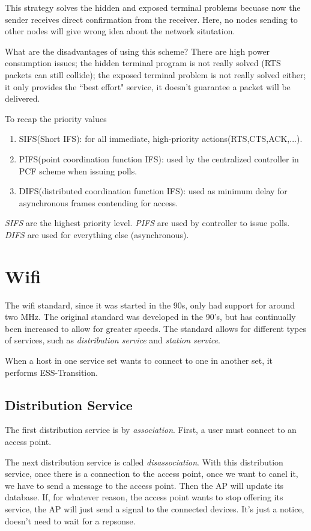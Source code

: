 \documentclass{article}
\begin{document}
This strategy solves the hidden and exposed terminal problems becuase now the sender receives direct confirmation from the 
receiver. Here, no nodes sending to other nodes will give wrong idea about the network situtation.

What are the disadvantages of using this scheme? There are high power consumption issues; the hidden terminal program is
not really solved (RTS packets can still collide); the exposed terminal problem is not really solved either; it only 
provides the ``best effort" service, it doesn't guarantee a packet will be delivered.

 To recap the priority values
\begin{enumerate}
		\item{SIFS(Short IFS)}: for all immediate, high-priority actions(RTS,CTS,ACK,...).
		\item{PIFS(point coordination function IFS)}: used by the centralized controller in PCF scheme when issuing polls.
		\item{DIFS(distributed coordination function IFS)}: used as minimum delay for asynchronous frames contending for
				access.
\end{enumerate}
\textit{SIFS} are the highest priority level.
\textit{PIFS} are used by controller to issue polls. 
\textit{DIFS} are used for everything else (asynchronous).

\section{Wifi}
The wifi standard, since it was started in the 90s, only had support for around two MHz.
The original standard was developed in the 90's, but has continually been increased to allow for greater speeds.
The standard allows for different types of services, such as \textit{distribution service} and \textit{station service}.

When a host in one service set wants to connect to one in another set, it performs ESS-Transition.
\subsection{Distribution Service}
The first distribution service is by \textit{association}. First, a user must connect to an access point.  

The next distribution service is called \textit{disassociation}. With this distribution service, once there is a connection
to the access point, once we want to canel it, we have to send a message to the access point. Then the AP will update its
database. If, for whatever reason, the access point wants to stop offering its service, the AP will just send a signal 
to the connected devices. It's just a notice, doesn't need to wait for a repsonse.
\end{document}
